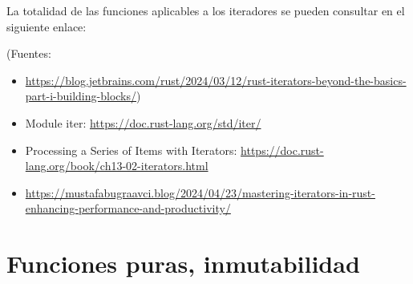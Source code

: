 La totalidad de las funciones aplicables a los iteradores se pueden consultar en el siguiente enlace:

{\centering \url{} \par}

(Fuentes: 
\begin{itemize}
   \item \url{https://blog.jetbrains.com/rust/2024/03/12/rust-iterators-beyond-the-basics-part-i-building-blocks/})
   \item Module iter: \url{https://doc.rust-lang.org/std/iter/}
   \item Processing a Series of Items with Iterators: \url{https://doc.rust-lang.org/book/ch13-02-iterators.html}
   \item \url{https://mustafabugraavci.blog/2024/04/23/mastering-iterators-in-rust-enhancing-performance-and-productivity/}
   
\end{itemize}



\chapter{Funciones puras, inmutabilidad}
\label{ch_funciones_puras}

\IndiceCapitulo


